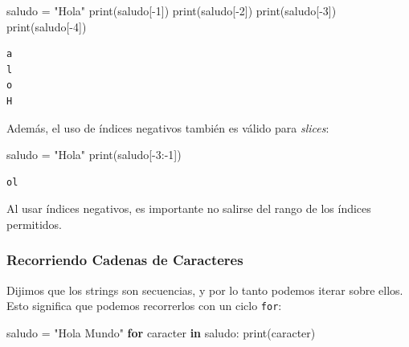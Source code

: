 \documentclass[
  letterpaper,
  DIV=11,
  numbers=noendperiod]{scrreprt}
\newenvironment{Shaded}{\begin{snugshade}}{\end{snugshade}}
\newcommand{\BuiltInTok}[1]{\textcolor[rgb]{0.00,0.23,0.31}{#1}}
\newcommand{\ControlFlowTok}[1]{\textcolor[rgb]{0.00,0.23,0.31}{\textbf{#1}}}
\newcommand{\DecValTok}[1]{\textcolor[rgb]{0.68,0.00,0.00}{#1}}
\newcommand{\KeywordTok}[1]{\textcolor[rgb]{0.00,0.23,0.31}{\textbf{#1}}}
\newcommand{\NormalTok}[1]{\textcolor[rgb]{0.00,0.23,0.31}{#1}}
\newcommand{\OperatorTok}[1]{\textcolor[rgb]{0.37,0.37,0.37}{#1}}
\newcommand{\StringTok}[1]{\textcolor[rgb]{0.13,0.47,0.30}{#1}}
\begin{document}
\begin{tcolorbox}
\begin{Shaded}
\begin{Highlighting}[]
\NormalTok{saludo }\OperatorTok{=} \StringTok{"Hola"}
\BuiltInTok{print}\NormalTok{(saludo[}\OperatorTok{{-}}\DecValTok{1}\NormalTok{])}
\BuiltInTok{print}\NormalTok{(saludo[}\OperatorTok{{-}}\DecValTok{2}\NormalTok{])}
\BuiltInTok{print}\NormalTok{(saludo[}\OperatorTok{{-}}\DecValTok{3}\NormalTok{])}
\BuiltInTok{print}\NormalTok{(saludo[}\OperatorTok{{-}}\DecValTok{4}\NormalTok{])}
\end{Highlighting}
\end{Shaded}

\begin{verbatim}
a
l
o
H
\end{verbatim}

Además, el uso de índices negativos también es válido para
\emph{slices}:

\begin{Shaded}
\begin{Highlighting}[]
\NormalTok{saludo }\OperatorTok{=} \StringTok{"Hola"}
\BuiltInTok{print}\NormalTok{(saludo[}\OperatorTok{{-}}\DecValTok{3}\NormalTok{:}\OperatorTok{{-}}\DecValTok{1}\NormalTok{])}
\end{Highlighting}
\end{Shaded}

\begin{verbatim}
ol
\end{verbatim}

Al usar índices negativos, es importante no salirse del rango de los
índices permitidos.

\end{tcolorbox}

\subsubsection{Recorriendo Cadenas de
Caracteres}\label{recorriendo-cadenas-de-caracteres}

Dijimos que los strings son secuencias, y por lo tanto podemos iterar
sobre ellos. Esto significa que podemos recorrerlos con un ciclo
\texttt{for}:

\begin{Shaded}
\begin{Highlighting}[]
\NormalTok{saludo }\OperatorTok{=} \StringTok{"Hola Mundo"}
\ControlFlowTok{for}\NormalTok{ caracter }\KeywordTok{in}\NormalTok{ saludo:}
    \BuiltInTok{print}\NormalTok{(caracter)}
\end{Highlighting}
\end{Shaded}
\end{document}
